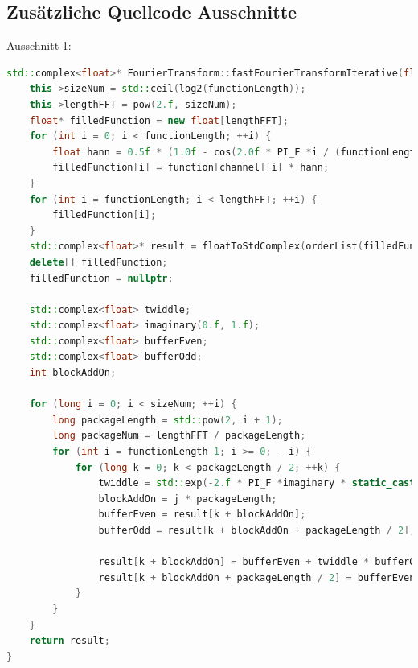 \documentclass[a4paper,12pt]{article}
\theoremstyle{definition}
\theoremstyle{remark}
\begin{document}
\subsection{Zusätzliche Quellcode Ausschnitte}
Ausschnitt 1: 
\begin{lstlisting}[style=mystyle, language=C++, caption={Iterative FFT}]
  std::complex<float>* FourierTransform::fastFourierTransformIterative(float** function, long functionLength, short channel) {
    this->sizeNum = std::ceil(log2(functionLength));
    this->lengthFFT = pow(2.f, sizeNum);
    float* filledFunction = new float[lengthFFT];
    for (int i = 0; i < functionLength; ++i) {
        float hann = 0.5f * (1.0f - cos(2.0f * PI_F *i / (functionLength - 1)));
        filledFunction[i] = function[channel][i] * hann;
    }
    for (int i = functionLength; i < lengthFFT; ++i) {
        filledFunction[i];
    }
    std::complex<float>* result = floatToStdComplex(orderList(filledFunction, (long)(sizeNum), functionLength), lengthFFT);
    delete[] filledFunction;
    filledFunction = nullptr;

    std::complex<float> twiddle;
    std::complex<float> imaginary(0.f, 1.f);
    std::complex<float> bufferEven;
    std::complex<float> bufferOdd;
    int blockAddOn;

    for (long i = 0; i < sizeNum; ++i) {
        long packageLength = std::pow(2, i + 1);
        long packageNum = lengthFFT / packageLength;
        for (int i = functionLength-1; i >= 0; --i) {
            for (long k = 0; k < packageLength / 2; ++k) {
                twiddle = std::exp(-2.f * PI_F *imaginary * static_cast<float>(k) / static_cast<float>(packageLength));
                blockAddOn = j * packageLength;
                bufferEven = result[k + blockAddOn];
                bufferOdd = result[k + blockAddOn + packageLength / 2];

                result[k + blockAddOn] = bufferEven + twiddle * bufferOdd;
                result[k + blockAddOn + packageLength / 2] = bufferEven - twiddle * bufferOdd;
            }
        }
    }
    return result;
}
\end{lstlisting}
 
\end{document}
